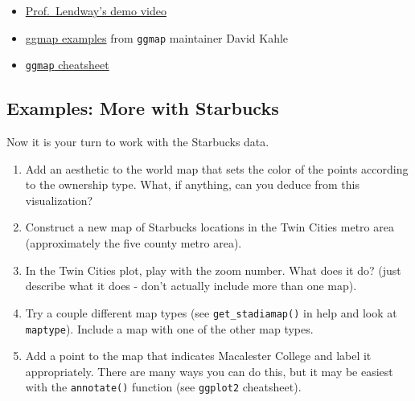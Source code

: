 \documentclass[
  letterpaper,
  DIV=11,
  numbers=noendperiod]{scrreprt}
\newenvironment{Shaded}{\begin{snugshade}}{\end{snugshade}}
\newcommand{\NormalTok}[1]{\textcolor[rgb]{0.00,0.23,0.31}{#1}}
\providecommand{\tightlist}{%
  \setlength{\itemsep}{0pt}\setlength{\parskip}{0pt}}\usepackage{longtable,booktabs,array}
\begin{document}
\begin{itemize}
\tightlist
\item
  \href{https://www.youtube.com/embed/2k8O-Y_uiRU}{Prof.~Lendway's demo
  video}
\item
  \href{https://github.com/dkahle/ggmap}{ggmap examples} from
  \texttt{ggmap} maintainer David Kahle\\
\item
  \href{https://www.nceas.ucsb.edu/sites/default/files/2020-04/ggmapCheatsheet.pdf}{\texttt{ggmap}
  cheatsheet}
\end{itemize}

\subsection*{Examples: More with
Starbucks}\label{examples-more-with-starbucks}

\begin{Shaded}
\begin{Highlighting}[]
\NormalTok{Now it is your turn to work with the Starbucks data. }
\end{Highlighting}
\end{Shaded}

\begin{enumerate}
\def\labelenumi{\alph{enumi}.}
\tightlist
\item
  Add an aesthetic to the world map that sets the color of the points
  according to the ownership type. What, if anything, can you deduce
  from this visualization?
\item
  Construct a new map of Starbucks locations in the Twin Cities metro
  area (approximately the five county metro area).\\
\item
  In the Twin Cities plot, play with the zoom number. What does it do?
  (just describe what it does - don't actually include more than one
  map).\\
\item
  Try a couple different map types (see \texttt{get\_stadiamap()} in
  help and look at \texttt{maptype}). Include a map with one of the
  other map types.
\item
  Add a point to the map that indicates Macalester College and label it
  appropriately. There are many ways you can do this, but it may be
  easiest with the \texttt{annotate()} function (see \texttt{ggplot2}
  cheatsheet).
\end{enumerate}
\end{document}
